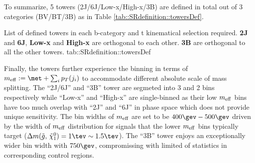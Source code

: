 To summarize, 5 towers (2J/6J/Low-x/High-x/3B) are defined in total out of 3 categories (BV/BT/3B) as in Table \ref{tab::SRdefinition::towersDef}. 


{List of defined towers in each b-category and t kinematical selection required. \textbf{2J} and \textbf{6J}, \textbf{Low-x} and \textbf{High-x} are orthogonal to each other. \textbf{3B} are orthogonal to all the other towers.}
{tab::SRdefinition::towersDef}


\clearpage
Finally, the towers further experience the binning in terms of $\meffInc := \met + \sum_{i} p_T (j_i)$ to accommodate different absolute scale of mass splitting. 
The ``2J/6J'' and ``3B'' tower are segmeted into 3 and 2 bins respectively while ``Low-x'' and ``High-x'' are single-binned as their low $m_{\mathrm{eff}}$ bins have too much overlap with ``2J'' and ``6J'' in phase space which does not provide unique sensitivity. The bin widths of $m_{\mathrm{eff}}$ are set to be $400\gev-500\gev$ driven by the width of $m_{\mathrm{eff}}$ distribution for signals that the lower $m_{\mathrm{eff}}$ bins typically target ($\dmg = 1\tev \sim 1.5\tev$). The ``3B'' tower enjoys an exceptionally wider bin width with $750\gev$, compromissing with limited of statistics in corresponding control regions. \\

